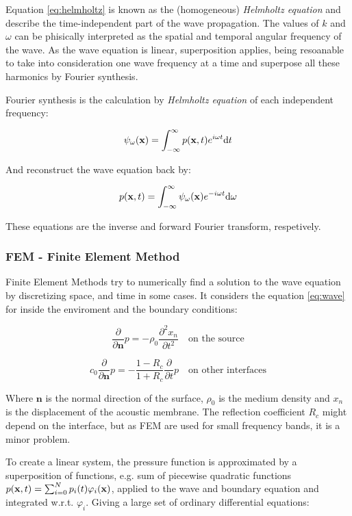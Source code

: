 Equation \ref{eq:helmholtz} is known as the (homogeneous) \textit{Helmholtz
equation} and describe the time-independent part of the wave propagation. The
values of $k$ and $\omega$ can be phisically interpreted as the spatial and
temporal angular frequency of the wave. As the wave equation is 
linear, superposition applies, being resoanable to take into consideration one
wave frequency at a time and superpose all these harmonics by Fourier synthesis\cite{Lefebvre}.

Fourier synthesis is the calculation by \textit{Helmholtz
equation} of each independent frequency: 

\[ \psi_\omega(\mathrm{\mathbf{x}}) = \int_{-\infty}^\infty p(\mathrm{\mathbf{x}},t)e^{i\omega t}\mathrm{d} t \]

And reconstruct the wave equation back by:

\[ p(\mathrm{\mathbf{x}},t) = \int_{-\infty}^\infty\psi_\omega(\mathrm{\mathbf{x}})e^{-i\omega t}\mathrm{d}\omega \]

These equations are the inverse and forward Fourier transform, respetively.

\subsubsection{FEM - Finite Element Method}

Finite Element Methods try to numerically find a solution to the wave equation
by discretizing space, and time in some cases. It considers the equation
\ref{eq:wave} for inside the enviroment and the boundary conditions:

\[  \frac{\partial}{\partial \mathbf{n}}p= -\rho_0 \frac{\partial^2
x_n}{\partial t^2} \quad \text{on the source} \]

\[  c_0 \frac{\partial}{\partial \mathbf{n}}p= - \frac{1-R_c}{1+R_c}
\frac{\partial}{\partial t} p \quad \text{on other interfaces} \]

Where $\mathbf{n}$ is the normal direction of the surface, $\rho_0$ is the
medium density and $x_n$ is the displacement of the acoustic membrane. The
reflection coefficient $R_c$ might depend on the interface, but as FEM are used
for small frequency bands, it is a minor problem\cite{deines2006comparative}.

To create a linear system, the pressure function is approximated by a
superposition of functions, e.g. sum of piecewise quadratic functions \(
p(\mathrm{\mathbf{x}},t)= \sum_{i=0}^N p_i(t) \varphi_i(\mathrm{\mathbf{x}}) \), applied to the wave and boundary
equation and integrated w.r.t. $\varphi_i$. Giving a large set of ordinary
differential equations:

